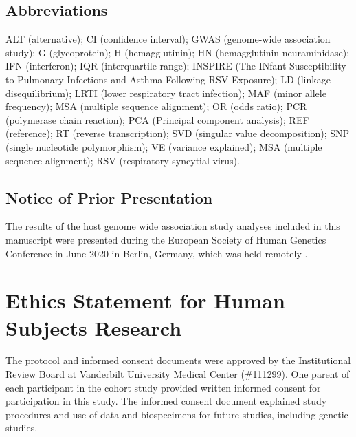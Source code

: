 \documentclass{article} %
\makeatletter
\renewcommand{\maketitle}{\bgroup\setlength{\parindent}{0pt}
\begin{flushleft}
  \textbf{\@title}

  \@author
\end{flushleft}\egroup
}
\makeatother
\begin{document}
\maketitle


\subsection*{Abbreviations}
ALT (alternative); CI (confidence interval); GWAS (genome-wide association study); G (glycoprotein); H (hemagglutinin); HN (hemagglutinin-neuraminidase); IFN (interferon); IQR (interquartile range); INSPIRE (The INfant Susceptibility to Pulmonary Infections and Asthma Following RSV Exposure); LD (linkage disequilibrium); LRTI (lower respiratory tract infection); MAF (minor allele frequency); MSA (multiple sequence alignment); OR (odds ratio); PCR (polymerase chain reaction); PCA (Principal component analysis); REF (reference); RT (reverse transcription); SVD (singular value decomposition); SNP (single nucleotide polymorphism); VE (variance explained); MSA (multiple sequence alignment); RSV (respiratory syncytial virus).

\subsection*{Notice of Prior Presentation}
The results of the host genome wide association study analyses included in this manuscript were presented during the European Society of Human Genetics Conference in June 2020 in Berlin, Germany, which was held remotely 
\citep{lawless2020genome}.

\section*{Ethics Statement for Human Subjects Research}
The protocol and informed consent documents were approved by the Institutional Review Board at Vanderbilt University Medical Center (\#111299). 
One parent of each participant in the cohort study provided written informed consent for participation in this study. 
The informed consent document explained study procedures and use of data and biospecimens for future studies, including genetic studies.

\end{document}
